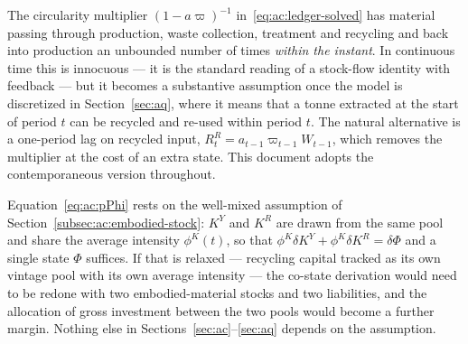 \begin{remark}\label{rem:ac:recirculation}
The circularity multiplier $\left(1-a\varpi\right)^{-1}$ in~\eqref{eq:ac:ledger-solved} has material passing through production, waste collection, treatment and recycling and back into production an unbounded number of times \emph{within the instant}. In continuous time this is innocuous --- it is the standard reading of a stock-flow identity with feedback --- but it becomes a substantive assumption once the model is discretized in Section~\ref{sec:aq}, where it means that a tonne extracted at the start of period $t$ can be recycled and re-used within period $t$. The natural alternative is a one-period lag on recycled input, $R^R_t=a_{t-1}\varpi_{t-1}W_{t-1}$, which removes the multiplier at the cost of an extra state. This document adopts the contemporaneous version throughout.
\end{remark}

\begin{remark}\label{rem:ac:Phi-pools}
Equation~\eqref{eq:ac:pPhi} rests on the well-mixed assumption of Section~\ref{subsec:ac:embodied-stock}: $K^Y$ and $K^R$ are drawn from the same pool and share the average intensity $\phi^K(t)$, so that $\phi^K\delta K^Y+\phi^K\delta K^R=\delta\Phi$ and a single state $\Phi$ suffices. If that is relaxed --- recycling capital tracked as its own vintage pool with its own average intensity --- the co-state derivation would need to be redone with two embodied-material stocks and two liabilities, and the allocation of gross investment between the two pools would become a further margin. Nothing else in Sections~\ref{sec:ac}--\ref{sec:aq} depends on the assumption.
\end{remark}

